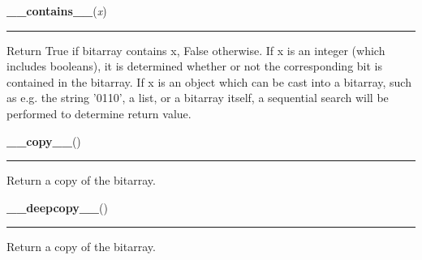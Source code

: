     \label{bitarray:_bitarray:__contains__}

    \vspace{0.5ex}

    \begin{boxedminipage}{\textwidth}

    \raggedright \textbf{\_\_contains\_\_}(\textit{x})

    \vspace{-1.5ex}

    \rule{\textwidth}{0.5\fboxrule}

Return True if bitarray contains x, False otherwise.
If x is an integer (which includes booleans), it is determined
whether or not the corresponding bit is contained in the bitarray.
If x is an object which can be cast into a bitarray, such as e.g.
the string '0110', a list, or a bitarray itself, a sequential search
will be performed to determine return value.
    \vspace{1ex}

    \end{boxedminipage}

    \label{bitarray:_bitarray:__copy__}

    \vspace{0.5ex}

    \begin{boxedminipage}{\textwidth}

    \raggedright \textbf{\_\_copy\_\_}()

    \vspace{-1.5ex}

    \rule{\textwidth}{0.5\fboxrule}

Return a copy of the bitarray.
    \vspace{1ex}

    \end{boxedminipage}

    \label{bitarray:_bitarray:__deepcopy__}

    \vspace{0.5ex}

    \begin{boxedminipage}{\textwidth}

    \raggedright \textbf{\_\_deepcopy\_\_}()

    \vspace{-1.5ex}

    \rule{\textwidth}{0.5\fboxrule}

Return a copy of the bitarray.
    \vspace{1ex}

    \end{boxedminipage}

